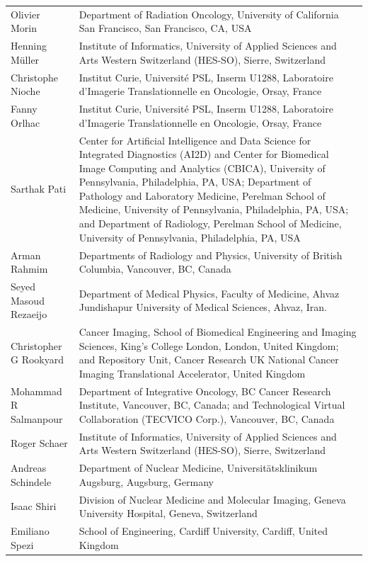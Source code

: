 \documentclass[fleqn,a4paper,oneside,openany]{book}
\begin{document}
\begin{longtable}{p{4cm}p{10cm}}
Olivier Morin & Department of Radiation Oncology, University of California San Francisco, San Francisco, CA, USA\\
Henning Müller & Institute of Informatics, University of Applied Sciences and Arts Western Switzerland (HES-SO), Sierre, Switzerland\\
Christophe Nioche & Institut Curie, Université PSL, Inserm U1288, Laboratoire d’Imagerie Translationnelle en Oncologie, Orsay, France\\
Fanny Orlhac & Institut Curie, Université PSL, Inserm U1288, Laboratoire d’Imagerie Translationnelle en Oncologie, Orsay, France\\
Sarthak Pati & Center for Artificial Intelligence and Data Science for Integrated Diagnostics (AI2D) and Center for Biomedical Image Computing and Analytics (CBICA), University of Pennsylvania, Philadelphia, PA, USA; Department of Pathology and Laboratory Medicine, Perelman School of Medicine, University of Pennsylvania, Philadelphia, PA, USA; and Department of Radiology, Perelman School of Medicine, University of Pennsylvania, Philadelphia, PA, USA\\
Arman Rahmim & Departments of Radiology and Physics, University of British Columbia, Vancouver, BC, Canada\\
Seyed Masoud Rezaeijo & Department of Medical Physics, Faculty of Medicine, Ahvaz Jundishapur University of Medical Sciences, Ahvaz, Iran.\\
Christopher G Rookyard & Cancer Imaging, School of Biomedical Engineering and Imaging Sciences, King's College London, London, United Kingdom; and Repository Unit, Cancer Research UK National Cancer Imaging Translational Accelerator, United Kingdom\\
Mohammad R Salmanpour & Department of Integrative Oncology, BC Cancer Research Institute, Vancouver, BC, Canada; and Technological Virtual Collaboration (TECVICO Corp.), Vancouver, BC, Canada\\
Roger Schaer & Institute of Informatics, University of Applied Sciences and Arts Western Switzerland (HES-SO), Sierre, Switzerland\\
Andreas Schindele & Department of Nuclear Medicine, Universitätsklinikum Augsburg, Augsburg, Germany\\
Isaac Shiri & Division of Nuclear Medicine and Molecular Imaging, Geneva University Hospital, Geneva, Switzerland\\
Emiliano Spezi & School of Engineering, Cardiff University, Cardiff, United Kingdom\\

\end{longtable}
\end{document}
